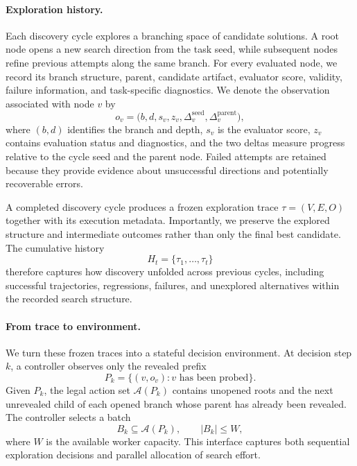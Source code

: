 \paragraph{Exploration history.}
Each discovery cycle explores a branching space of candidate solutions. A root
node opens a new search direction from the task seed, while subsequent nodes
refine previous attempts along the same branch. For every evaluated node, we
record its branch structure, parent, candidate artifact, evaluator score,
validity, failure information, and task-specific diagnostics. We denote the
observation associated with node $v$ by
\begin{equation}
    o_v =
    \bigl(
        b,d,s_v,z_v,
        \Delta_v^{\mathrm{seed}},
        \Delta_v^{\mathrm{parent}}
    \bigr),
\end{equation}
where $(b,d)$ identifies the branch and depth, $s_v$ is the evaluator score,
$z_v$ contains evaluation status and diagnostics, and the two deltas measure
progress relative to the cycle seed and the parent node. Failed attempts are
retained because they provide evidence about unsuccessful directions and
potentially recoverable errors.

A completed discovery cycle produces a frozen exploration trace
$\tau=(V,E,O)$ together with its execution metadata. Importantly, we preserve
the explored structure and intermediate outcomes rather than only the final
best candidate. The cumulative history
\begin{equation}
    H_t = \{\tau_1,\ldots,\tau_t\}
\end{equation}
therefore captures how discovery unfolded across previous cycles, including
successful trajectories, regressions, failures, and unexplored alternatives
within the recorded search structure.

\paragraph{From trace to environment.}
We turn these frozen traces into a stateful decision environment. At decision
step $k$, a controller observes only the revealed prefix
\begin{equation}
    P_k = \{(v,o_v): v \text{ has been probed}\}.
\end{equation}
Given $P_k$, the legal action set $\mathcal{A}(P_k)$ contains unopened roots and
the next unrevealed child of each opened branch whose parent has already been
revealed. The controller selects a batch
\begin{equation}
    B_k \subseteq \mathcal{A}(P_k),
    \qquad |B_k|\leq W,
\end{equation}
where $W$ is the available worker capacity. This interface captures both
sequential exploration decisions and parallel allocation of search effort.

